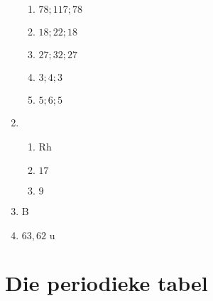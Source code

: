 \begin{multicols}{4}
\begin{enumerate}[noitemsep, label=\textbf{\arabic*}. ]
    \begin{enumerate}[noitemsep, label=\textbf{(\alph*)} ]
    \item $78 ; 117 ; 78$
    \item $18 ; 22 ; 18$
    \item $27 ; 32 ; 27$
    \item $3 ; 4 ; 3$
    \item $5 ; 6 ; 5$
    \end{enumerate}
\item %
  \begin{enumerate}[noitemsep, label=\textbf{(\alph*)} ]
  \item Rh
  \item $17$
  \item $9$
  \end{enumerate}
\item %
B
\item %
$63,62 \text{ u}$
\end{enumerate}
\end{multicols}
\section{Die periodieke tabel}
